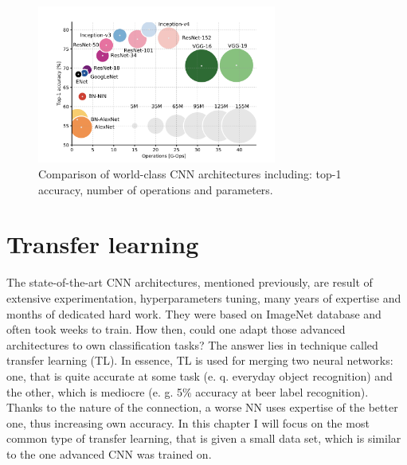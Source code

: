 \documentclass[11pt]{article}
\begin{document}
\begin{figure}[h]
\includegraphics[width=0.7\textwidth]{world_cnns}
\centering
\caption{Comparison of world-class CNN architectures \cite{canziani_analysis} including: top-1 accuracy, number of operations and parameters.}
\label{fig:world_cnns}
\end{figure}
\clearpage

\section{Transfer learning} \label{transfer_learning}
The state-of-the-art CNN architectures, mentioned previously, are result of extensive experimentation, hyperparameters tuning, many years of expertise and months of dedicated hard work. They were based on ImageNet database and often took weeks to train. How then, could one adapt those advanced architectures to own classification tasks? The answer lies in technique called transfer learning (TL). In essence, TL is used for merging two neural networks: one, that is quite accurate at some task (e. q. everyday object recognition) and the other, which is mediocre (e. g. 5\% accuracy at beer label recognition). Thanks to the nature of the connection, a worse NN uses expertise of the better one, thus increasing own accuracy. In this chapter I will focus on the most common type of transfer learning, that is given a small data set, which is similar to the one advanced CNN was trained on.\\
\end{document}
